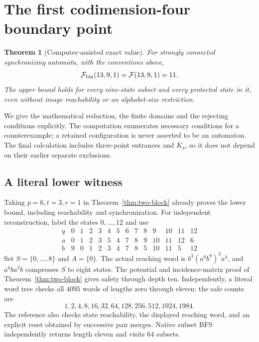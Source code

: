 \documentclass[10pt]{article}
\newtheorem{theorem}{Theorem}
\newcommand{\Max}{\mathcal F}
\begin{document}
\section{The first codimension-four boundary point}
\begin{theorem}[Computer-assisted exact value]\label{thm:eleven}
For strongly connected synchronizing automata, with the conventions above,
\[
 \Max_{\rm bin}(13,9,1)=\Max(13,9,1)=11.
\]
The upper bound holds for every nine-state subset and every protected state
in it, even without image reachability or an alphabet-size restriction.
\end{theorem}
We give the mathematical reduction, the finite domains and the rejecting
conditions explicitly. The computation enumerates necessary conditions
for a counterexample; a retained configuration is never asserted to be an
automaton. The final calculation includes three-point entrances and $K_4$,
so it does not depend on their earlier separate exclusions.

\subsection{A literal lower witness}
Taking $p=6,t=3,r=1$ in Theorem~\ref{thm:two-block} already proves the
lower bound, including reachability and synchronization. For independent
reconstruction, label the states $0,\ldots,12$ and use
\[
\begin{array}{c|rrrrrrrrrrrrr}
q&0&1&2&3&4&5&6&7&8&9&10&11&12\\\hline
a&0&1&2&3&5&4&7&8&9&10&11&12&6\\
b&9&0&1&2&3&4&7&8&5&10&11&5&12
\end{array}
\]
Set $S=\{0,\ldots,8\}$ and $A=\{0\}$. The actual reaching word is
$b^3(a^6b^9)^3a^4$, and $a^6ba^3b$ compresses $S$ to eight states.
The potential and incidence-matrix proof of Theorem~\ref{thm:two-block}
gives safety through depth ten. Independently, a literal word tree checks
all $4095$ words of lengths zero through eleven: the safe counts are
\[1,2,4,8,16,32,64,128,256,512,1024,1984.\]
The reference also checks state reachability, the displayed reaching word,
and an explicit reset obtained by successive pair merges. Native subset
BFS independently returns length eleven and visits $64$ subsets.
\end{document}
